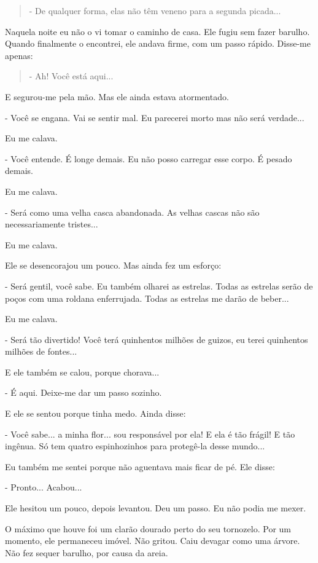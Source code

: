 \begin{quote}
- De qualquer forma, elas não têm veneno para a segunda picada...
\end{quote}

Naquela noite eu não o vi tomar o caminho de casa. Ele fugiu sem fazer
barulho. Quando finalmente o encontrei, ele andava firme, com um passo
rápido. Disse-me apenas:

\begin{quote}
- Ah! Você está aqui...
\end{quote}

E segurou-me pela mão. Mas ele ainda estava atormentado.

- Você se engana. Vai se sentir mal. Eu parecerei morto mas não será
verdade...

Eu me calava.

- Você entende. É longe demais. Eu não posso carregar esse corpo. É
pesado demais.

Eu me calava.

- Será como uma velha casca abandonada. As velhas cascas não são
necessariamente tristes...

Eu me calava.

Ele se desencorajou um pouco. Mas ainda fez um esforço:

- Será gentil, você sabe. Eu também olharei as estrelas. Todas as
estrelas serão de poços com uma roldana enferrujada. Todas as estrelas
me darão de beber...

Eu me calava.

- Será tão divertido! Você terá quinhentos milhões de guizos, eu terei
quinhentos milhões de fontes...

E ele também se calou, porque chorava...

- É aqui. Deixe-me dar um passo sozinho.

E ele se sentou porque tinha medo. Ainda disse:

- Você sabe... a minha flor... sou responsável por ela! E ela é tão
frágil! E tão ingênua. Só tem quatro espinhozinhos para protegê-la desse
mundo...

Eu também me sentei porque não aguentava mais ficar de pé. Ele disse:

- Pronto... Acabou...

Ele hesitou um pouco, depois levantou. Deu um passo. Eu não podia me
mexer.

O máximo que houve foi um clarão dourado perto do seu tornozelo. Por um
momento, ele permaneceu imóvel. Não gritou. Caiu devagar como uma
árvore. Não fez sequer barulho, por causa da areia.

